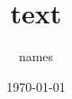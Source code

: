 %
%
%
%
%
%
%
%
%
%
%
%
%
%
%
%


\documentclass[%
cdfont=false,
cdmath=false,cd=false
]{tudscrbook}
\usepackage[%
  detect-all=true,
]{siunitx}




\title{text}
\author{names}
\date{\today}

\makecover[cdcover]

